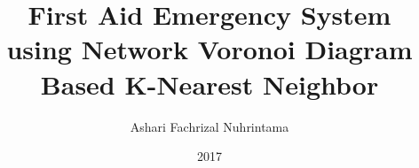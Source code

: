 \documentclass[a4paper,12pt,oneside]{book}
\title{First Aid Emergency System \\using Network Voronoi Diagram Based K-Nearest Neighbor}\let\Title\@title   %
\author{Ashari Fachrizal Nuhrintama}  \let\Author\@author  %
\date{2017}           \let\Date\@date %
\newif\iflogTA
\begin{document}
\begin{titlepage}
\thispagestyle{empty}

\pagebreak
\thispagestyle{empty}

\pagebreak
\thispagestyle{empty}

\pagebreak
\end{titlepage}

\iflogTA
\pagebreak
\addcontentsline{toc}{chapter}{Abstract}

\pagebreak
\addcontentsline{toc}{chapter}{Dedication}

\pagebreak
\addcontentsline{toc}{chapter}{Acknowledgement}

\pagebreak
\fi
\cleardoublepage
{}
\tableofcontents
\iflogTA
\newpage
\cleardoublepage
\addcontentsline{toc}{chapter}{List of Figures}
\listoffigures
\newpage
\cleardoublepage
\addcontentsline{toc}{chapter}{List of Tables}
\listoftables
\fi
%
\cleardoublepage
{}

%

%

%

%

%

%
\cleardoublepage
{}

%
\end{document}

